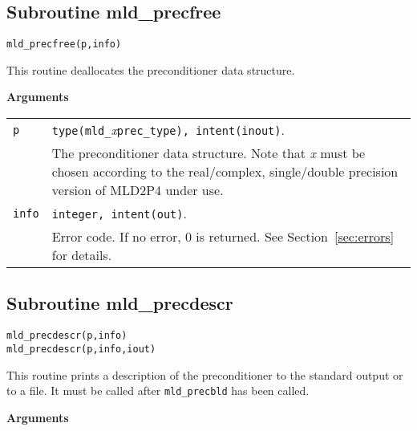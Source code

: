 \clearpage

\subsection{Subroutine mld\_precfree\label{sec:precfree}}

\begin{center}
\verb|mld_precfree(p,info)|\\
\end{center}

\noindent
This routine deallocates the preconditioner data structure.

{\baselineskip\noindent\large\bfseries Arguments}

\begin{tabular}{p{1.2cm}p{10.5cm}}
\verb|p|      & \verb|type(mld_|\emph{x}\verb|prec_type), intent(inout)|.\\
              & The preconditioner data structure. Note that \emph{x} must be chosen according
                to the real/complex, single/double precision version of MLD2P4 under use.\\
\verb|info|   & \verb|integer, intent(out)|.\\
              & Error code. If no error, 0 is returned. See Section~\ref{sec:errors} for details.\\
\end{tabular}

\clearpage

\subsection{Subroutine mld\_precdescr\label{sec:precdescr}}

\begin{center}
\verb|mld_precdescr(p,info)|\\
\verb|mld_precdescr(p,info,iout)|\\
\end{center}

\noindent
This routine prints a description of the preconditioner to the standard output or
to a file. It must be called after \verb|mld_precbld| has been called.

{\baselineskip\noindent\large\bfseries Arguments}

